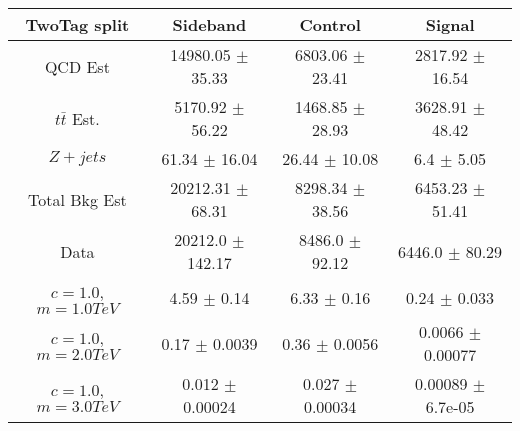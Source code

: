 \begin{footnotesize} 
\begin{tabular}{c|c|c|c} 
TwoTag split & Sideband & Control & Signal \\ 
\hline\hline 
QCD Est & 14980.05 $\pm$ 35.33 & 6803.06 $\pm$ 23.41 & 2817.92 $\pm$ 16.54\\ 
$t\bar{t}$ Est.  & 5170.92 $\pm$ 56.22 & 1468.85 $\pm$ 28.93 & 3628.91 $\pm$ 48.42\\ 
$Z+jets$ & 61.34 $\pm$ 16.04 & 26.44 $\pm$ 10.08 & 6.4 $\pm$ 5.05\\ 
Total Bkg Est & 20212.31 $\pm$ 68.31 & 8298.34 $\pm$ 38.56 & 6453.23 $\pm$ 51.41\\ 
Data & 20212.0 $\pm$ 142.17 & 8486.0 $\pm$ 92.12 & 6446.0 $\pm$ 80.29\\ 
$c=1.0$,$m=1.0TeV$ & 4.59 $\pm$ 0.14 & 6.33 $\pm$ 0.16 & 0.24 $\pm$ 0.033\\ 
$c=1.0$,$m=2.0TeV$ & 0.17 $\pm$ 0.0039 & 0.36 $\pm$ 0.0056 & 0.0066 $\pm$ 0.00077\\ 
$c=1.0$,$m=3.0TeV$ & 0.012 $\pm$ 0.00024 & 0.027 $\pm$ 0.00034 & 0.00089 $\pm$ 6.7e-05\\ 
\hline\hline 
\end{tabular} 
\end{footnotesize} 
\newline 
